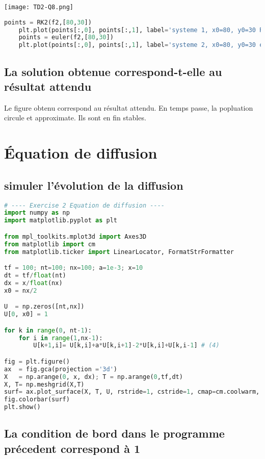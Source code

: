 \documentclass[a4paper,10pt]{article}
\begin{document}
\begin{center}
\texttt{[image: TD2-Q8.png]}
\end{center}

\begin{lstlisting}[language=Python]
    points = RK2(f2,[80,30])
    plt.plot(points[:,0], points[:,1], label='systeme 1, x0=80, y0=30 RK2')
    points = euler(f2,[80,30])
    plt.plot(points[:,0], points[:,1], label='systeme 2, x0=80, y0=30 euler')
\end{lstlisting}

\subsection { La solution obtenue correspond-t-elle au résultat attendu }
    Le figure obtenu correspond au résultat attendu. En temps passe, la popluation circule et approximate. Ils sont en fin stables. 

\section{Équation de diffusion}
\subsection { simuler l'évolution de la diffusion }
\begin{lstlisting}[language=Python]
# ---- Exercise 2 Equation de diffusion ----
import numpy as np
import matplotlib.pyplot as plt

from mpl_toolkits.mplot3d import Axes3D
from matplotlib import cm
from matplotlib.ticker import LinearLocator, FormatStrFormatter

tf = 100; nt=100; nx=100; a=1e-3; x=10
dt = tf/float(nt)
dx = x/float(nx) 
x0 = nx/2

U  = np.zeros([nt,nx])
U[0, x0] = 1

for k in range(0, nt-1):
    for i in range(1,nx-1):
        U[k+1,i]= U[k,i]+a*U[k,i+1]-2*U[k,i]+U[k,i-1] # (4)

fig = plt.figure()
ax  = fig.gca(projection ='3d')
X   = np.arange(0, x, dx); T = np.arange(0,tf,dt)
X, T= np.meshgrid(X,T)
surf= ax.plot_surface(X, T, U, rstride=1, cstride=1, cmap=cm.coolwarm, linewidth = 0, antialiased =False)
fig.colorbar(surf)
plt.show()
\end{lstlisting}

\subsection{La condition de bord dans le programme précedent correspond à 1}
\end{document}
